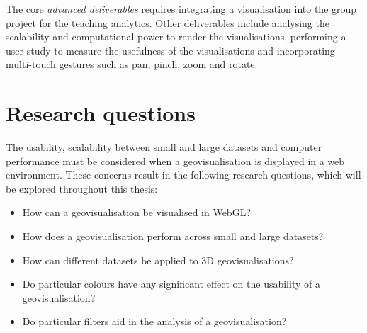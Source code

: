 {	The core \emph{advanced deliverables} requires integrating a visualisation into the group project for the teaching analytics. Other deliverables include analysing the scalability and computational power to render the visualisations, performing a user study to measure the usefulness of the visualisations and incorporating multi-touch gestures such as pan, pinch, zoom and rotate.
	
}

\section{Research questions} {
\label{sec:research_questions}


	The usability, scalability between small and large datasets and computer performance must be considered when a geovisualisation is displayed in a web environment. These concerns result in the following research questions, which will be explored throughout this thesis:

	\begin{itemize}
		\item How can a geovisualisation be visualised in WebGL?
		\item How does a geovisualisation perform across small and large datasets?
		\item How can different datasets be applied to 3D geovisualisations?
		\item Do particular colours have any significant effect on the usability of a geovisualisation?
		\item Do particular filters aid in the analysis of a geovisualisation?
	\end{itemize}

}
